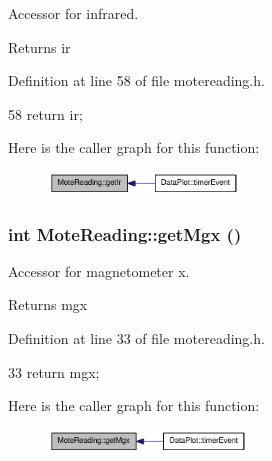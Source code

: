 Accessor for infrared. 

\begin{DoxyReturn}{Returns}
ir 
\end{DoxyReturn}


Definition at line 58 of file motereading.h.




\begin{DoxyCode}
58 { return ir; }
\end{DoxyCode}




Here is the caller graph for this function:\nopagebreak
\begin{figure}[H]
\begin{center}
\leavevmode
\includegraphics[width=143pt]{classMoteReading_aff0d87f9c667d01f7e37a114afa321fa_icgraph}
\end{center}
\end{figure}


\hypertarget{classMoteReading_a318b7e6afba062ee3df207495070e277}{
\subsubsection[{getMgx}]{\setlength{\rightskip}{0pt plus 5cm}int MoteReading::getMgx ()}}
\label{classMoteReading_a318b7e6afba062ee3df207495070e277}


Accessor for magnetometer x. 

\begin{DoxyReturn}{Returns}
mgx 
\end{DoxyReturn}


Definition at line 33 of file motereading.h.




\begin{DoxyCode}
33 { return mgx; }
\end{DoxyCode}




Here is the caller graph for this function:\nopagebreak
\begin{figure}[H]
\begin{center}
\leavevmode
\includegraphics[width=149pt]{classMoteReading_a318b7e6afba062ee3df207495070e277_icgraph}
\end{center}
\end{figure}


